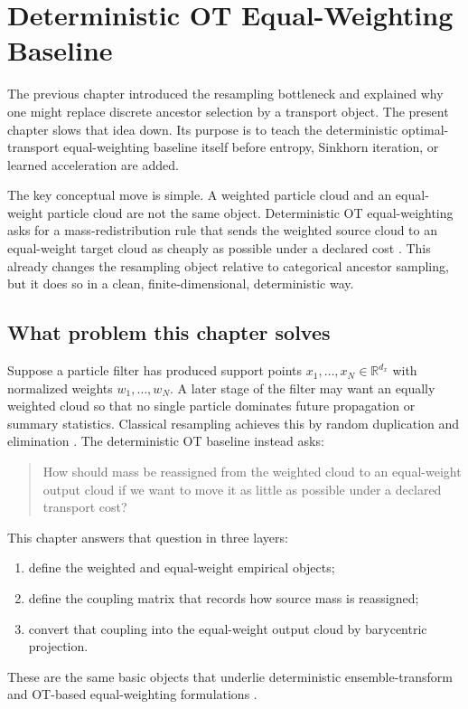 \chapter{Deterministic OT Equal-Weighting Baseline}
\label{ch:bf-dpf-ot-baseline}

The previous chapter introduced the resampling bottleneck and explained why one
might replace discrete ancestor selection by a transport object.  The present
chapter slows that idea down.  Its purpose is to teach the deterministic optimal-
transport equal-weighting baseline itself before entropy, Sinkhorn iteration, or
learned acceleration are added.

The key conceptual move is simple.  A weighted particle cloud and an equal-weight
particle cloud are not the same object.  Deterministic OT equal-weighting asks for
a mass-redistribution rule that sends the weighted source cloud to an equal-weight
target cloud as cheaply as possible under a declared cost \citep{villani2003topics,peyre2019computational,reich2013nonparametric}.  This already changes
the resampling object relative to categorical ancestor sampling, but it does so in
a clean, finite-dimensional, deterministic way.

\section{What problem this chapter solves}
\label{sec:bf-ot-baseline-problem}

Suppose a particle filter has produced support points
\(x_1,\ldots,x_N\in\mathbb R^{d_x}\) with normalized weights
\(w_1,\ldots,w_N\).  A later stage of the filter may want an equally weighted
cloud so that no single particle dominates future propagation or summary
statistics.  Classical resampling achieves this by random duplication and
elimination \citep{doucet2001sequential,chopin2020introduction}.  The deterministic OT baseline instead asks:

\begin{quote}
How should mass be reassigned from the weighted cloud to an equal-weight output
cloud if we want to move it as little as possible under a declared transport
cost?
\end{quote}

This chapter answers that question in three layers:
\begin{enumerate}[label=(\roman*)]
  \item define the weighted and equal-weight empirical objects;
  \item define the coupling matrix that records how source mass is reassigned;
  \item convert that coupling into the equal-weight output cloud by barycentric
  projection.
\end{enumerate}
These are the same basic objects that underlie deterministic ensemble-transform
and OT-based equal-weighting formulations \citep{reich2013nonparametric,peyre2019computational}.

